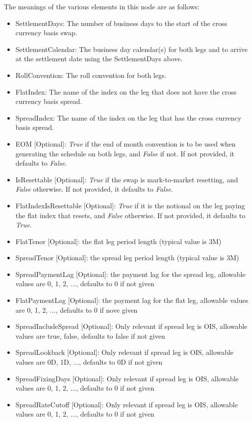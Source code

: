 The meanings of the various elements in this node are as follows:
\begin{itemize}
\item SettlementDays: The number of business days to the start of the cross currency basis swap.
\item SettlementCalendar: The business day calendar(s) for both legs and to arrive at the settlement date using the
SettlementDays above.
\item RollConvention: The roll convention for both legs.
\item FlatIndex: The name of the index on the leg that does not have the cross currency basis spread.
\item SpreadIndex: The name of the index on the leg that has the cross currency basis spread.
\item EOM [Optional]: \emph{True} if the end of month convention is to be used when generating the schedule on both legs, and \emph{False} if not. If not provided, it defaults to \emph{False}.
\item IsResettable [Optional]: \emph{True} if the swap is mark-to-market resetting, and \emph{False} otherwise. If not provided, it defaults to \emph{False}.
\item FlatIndexIsResettable [Optional]: \emph{True} if it is the notional on the leg paying the flat index that resets, and \emph{False} otherwise. If not provided, it defaults to \emph{True}.
\item FlatTenor [Optional]: the flat leg period length (typical value is 3M)
\item SpreadTenor [Optional]: the spread leg period length (typical value is 3M)
\item SpreadPaymentLag [Optional]: the payment lag for the spread leg, allowable values are 0, 1, 2, ..., defaults to 0 if not given
\item FlatPaymentLag [Optional]: the payment lag for the flat leg, allowable values are 0, 1, 2, ..., defaults to 0 if nove given
\item SpreadIncludeSpread [Optional]: Only relevant if spread leg is OIS, allowable values are true, false, defaults to false if not given
\item SpreadLookback [Optional]: Only relevant if spread leg is OIS, allowable values are 0D, 1D, ..., defaults to 0D if not given
\item SpreadFixingDays [Optional]: Only relevant if spread leg is OIS, allowable values are 0, 1, 2, ..., defaults to 0 if not given
\item SpreadRateCutoff [Optional]: Only relevant if spread leg is OIS, allowable values are 0, 1, 2, ..., defaults to 0 if not given

\end{itemize}
